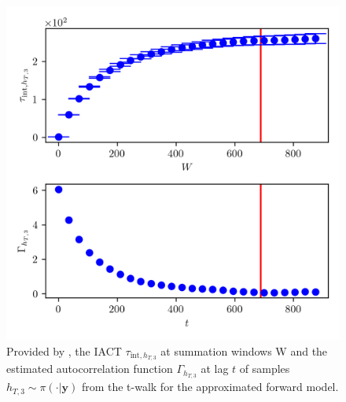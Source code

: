 \begin{figure}[ht!]
	\centering
	\includegraphics{UwerrTauIntTWalk6.png}
	\caption[IACT and autocorrelation function of samples $h_{T,3} \sim \pi(\cdot|\bm{y})$, for approximated model.]{Provided by \cite{drikHesse}, the IACT $\tau_{\text{int},h_{T,3}}$ at summation windows W and the estimated autocorrelation function $\Gamma_{h_{T,3}}$ at lag $t$ of samples $h_{T,3} \sim \pi( \cdot| \bm{y})$ from the t-walk for the approximated forward model.}
	\label{fig:TWalkIATC7}
\end{figure}

